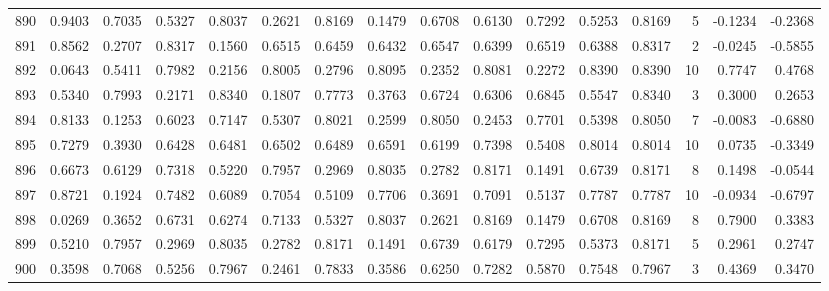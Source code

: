 \begin{tabular}{lrrrrrrrrrrrrrrr}
890 &      0.9403 &  0.7035 &  0.5327 &  0.8037 &  0.2621 &  0.8169 &  0.1479 &  0.6708 &  0.6130 &  0.7292 &   0.5253 &     0.8169 &      5 &                   -0.1234 &                    -0.2368 \\
891 &      0.8562 &  0.2707 &  0.8317 &  0.1560 &  0.6515 &  0.6459 &  0.6432 &  0.6547 &  0.6399 &  0.6519 &   0.6388 &     0.8317 &      2 &                   -0.0245 &                    -0.5855 \\
892 &      0.0643 &  0.5411 &  0.7982 &  0.2156 &  0.8005 &  0.2796 &  0.8095 &  0.2352 &  0.8081 &  0.2272 &   0.8390 &     0.8390 &     10 &                    0.7747 &                     0.4768 \\
893 &      0.5340 &  0.7993 &  0.2171 &  0.8340 &  0.1807 &  0.7773 &  0.3763 &  0.6724 &  0.6306 &  0.6845 &   0.5547 &     0.8340 &      3 &                    0.3000 &                     0.2653 \\
894 &      0.8133 &  0.1253 &  0.6023 &  0.7147 &  0.5307 &  0.8021 &  0.2599 &  0.8050 &  0.2453 &  0.7701 &   0.5398 &     0.8050 &      7 &                   -0.0083 &                    -0.6880 \\
895 &      0.7279 &  0.3930 &  0.6428 &  0.6481 &  0.6502 &  0.6489 &  0.6591 &  0.6199 &  0.7398 &  0.5408 &   0.8014 &     0.8014 &     10 &                    0.0735 &                    -0.3349 \\
896 &      0.6673 &  0.6129 &  0.7318 &  0.5220 &  0.7957 &  0.2969 &  0.8035 &  0.2782 &  0.8171 &  0.1491 &   0.6739 &     0.8171 &      8 &                    0.1498 &                    -0.0544 \\
897 &      0.8721 &  0.1924 &  0.7482 &  0.6089 &  0.7054 &  0.5109 &  0.7706 &  0.3691 &  0.7091 &  0.5137 &   0.7787 &     0.7787 &     10 &                   -0.0934 &                    -0.6797 \\
898 &      0.0269 &  0.3652 &  0.6731 &  0.6274 &  0.7133 &  0.5327 &  0.8037 &  0.2621 &  0.8169 &  0.1479 &   0.6708 &     0.8169 &      8 &                    0.7900 &                     0.3383 \\
899 &      0.5210 &  0.7957 &  0.2969 &  0.8035 &  0.2782 &  0.8171 &  0.1491 &  0.6739 &  0.6179 &  0.7295 &   0.5373 &     0.8171 &      5 &                    0.2961 &                     0.2747 \\
900 &      0.3598 &  0.7068 &  0.5256 &  0.7967 &  0.2461 &  0.7833 &  0.3586 &  0.6250 &  0.7282 &  0.5870 &   0.7548 &     0.7967 &      3 &                    0.4369 &                     0.3470 \\

\end{tabular}
